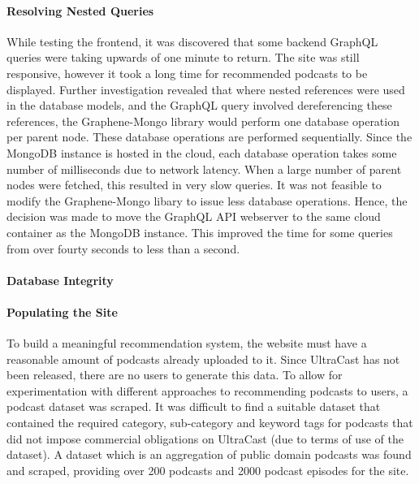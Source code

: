 \documentclass[../report.tex]{subfiles}
\begin{document}
    \paragraph{Resolving Nested Queries} 

    While testing the frontend, it was discovered that some backend GraphQL queries were taking upwards of one minute to return.
    The site was still responsive, however it took a long time for recommended podcasts to be displayed.
    Further investigation revealed that where nested references were used in the database models, and the GraphQL query involved dereferencing these references, the Graphene-Mongo library would perform one database operation per parent node.
    These database operations are performed sequentially. 
    Since the MongoDB instance is hosted in the cloud, each database operation takes some number of milliseconds due to network latency.
    When a large number of parent nodes were fetched, this resulted in very slow queries.
    It was not feasible to modify the Graphene-Mongo libary to issue less database operations.
    Hence, the decision was made to move the GraphQL API webserver to the same cloud container as the MongoDB instance.
    This improved the time for some queries from over fourty seconds to less than a second.

    \paragraph{Database Integrity}

    \paragraph{Populating the Site}

    To build a meaningful recommendation system, the website must have a reasonable amount of podcasts already uploaded to it.
    Since UltraCast has not been released, there are no users to generate this data.
    To allow for experimentation with different approaches to recommending podcasts to users, a podcast dataset was scraped.
    It was difficult to find a suitable dataset that contained the required category, sub-category and keyword tags for podcasts that did not impose commercial obligations on UltraCast (due to terms of use of the dataset).
    A dataset which is an aggregation of public domain podcasts was found and scraped, providing over 200 podcasts and 2000 podcast episodes for the site.

\fi



\end{document}
